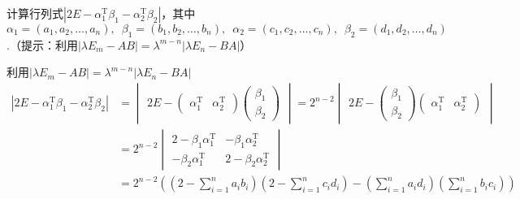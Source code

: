 \begin{exercise}
\begin{exgroup}
        \item 计算行列式$|2E-\alpha_1^\mathrm{T}\beta_1-\alpha_2^\mathrm{T}\beta_2|$，其中$\alpha_1=(a_1,a_2,\ldots,a_n),\enspace \beta_1=(b_1,b_2,\ldots,b_n),\enspace \alpha_2=(c_1,c_2,\ldots,c_n),\enspace \beta_2 = (d_1,d_2,\ldots,d_n)$.（提示：利用$|\lambda E_m-AB|=\lambda^{m-n}|\lambda E_n-BA|$）
        \begin{answer}
            利用$|\lambda E_m-AB|=\lambda^{m-n}|\lambda E_n-BA|$
            \begin{align*}
                |2E-\alpha_1^\mathrm{T}\beta_1-\alpha_2^\mathrm{T}\beta_2|
                & =\begin{vmatrix}
                        2E-\begin{pmatrix}
                        \alpha_1^\mathrm{T} & \alpha_2^\mathrm{T}
                    \end{pmatrix}\begin{pmatrix}
                                        \beta_1 \\\beta_2
                                    \end{pmatrix}
                    \end{vmatrix}
                =2^{n-2}\begin{vmatrix}
                            2E-\begin{pmatrix}
                        \beta_1 \\\beta_2
                    \end{pmatrix}\begin{pmatrix}
                                        \alpha_1^\mathrm{T} & \alpha_2^\mathrm{T}
                                    \end{pmatrix}
                        \end{vmatrix}         \\
                & =2^{n-2}\begin{vmatrix}
                            2-\beta_1\alpha_1^\mathrm{T} & -\beta_1\alpha_2^\mathrm{T}  \\
                            -\beta_2\alpha_1^\mathrm{T}  & 2-\beta_2\alpha_2^\mathrm{T}
                        \end{vmatrix} \\
                & =2^{n-2}
                \left(\left(2-\sum_{i=1}^na_ib_i\right)
                \left(2-\sum_{i=1}^nc_id_i\right)
                -\left(\sum_{i=1}^na_id_i\right)
                \left(\sum_{i=1}^nb_ic_i\right)\right)
            \end{align*}
        \end{answer}


\end{exgroup}
\end{exercise}
